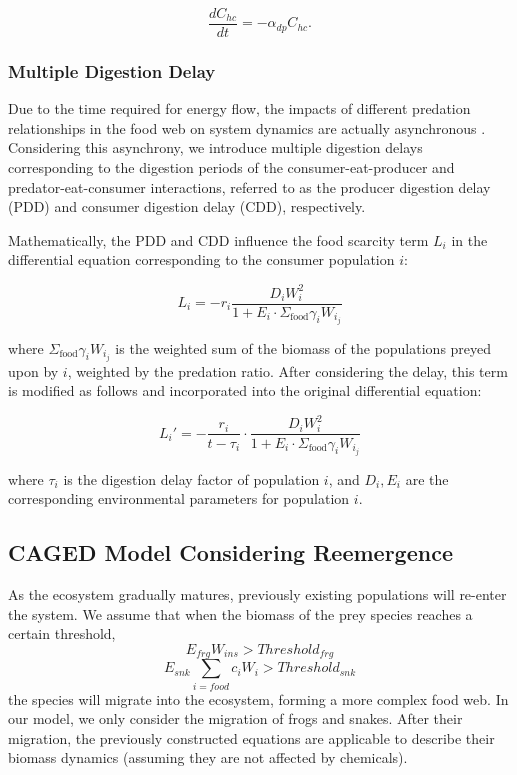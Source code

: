 \documentclass{HZNUMCM}
\begin{document}
        \begin{equation}
        \frac{dC_{hc}}{dt} = - \alpha_{dp} C_{hc}.
        \end{equation}
      
      \subsubsection{Multiple Digestion Delay}
        Due to the time required for energy flow, 
        the impacts of different predation relationships in the food web on system dynamics are actually asynchronous \cite{GUO20142850}. 
        Considering this asynchrony, 
        we introduce multiple digestion delays corresponding to the digestion periods of the consumer-eat-producer and predator-eat-consumer interactions, 
        referred to as the producer digestion delay (PDD) and consumer digestion delay (CDD), respectively.

        Mathematically, the PDD and CDD influence the food scarcity term \(L_i\) in the differential equation corresponding to the consumer population \(i\):
        
        \begin{equation}
        L_i = -r_i \frac{D_i W_i^2}{1 + E_i \cdot \Sigma_{\text{food}} \gamma_i W_{i_j}}
        \end{equation}

        where \(\Sigma_{\text{food}} \gamma_i W_{i_j}\) is the weighted sum of the biomass of the populations preyed upon by \(i\), weighted by the predation ratio. 
        After considering the delay, this term is modified as follows and incorporated into the original differential equation:
        
        \begin{equation}
        L_i' = -\frac{r_i}{t - \tau_i} \cdot \frac{D_i W_i^2}{1 + E_i \cdot \Sigma_{\text{food}} \gamma_i W_{i_j}}
        \end{equation}

        where \(\tau_i\) is the digestion delay factor of population \(i\), and \(D_i, E_i\) are the corresponding environmental parameters for population \(i\).
    \subsection{CAGED Model Considering Reemergence}
      As the ecosystem gradually matures, 
      previously existing populations will re-enter the system. 
      We assume that when the biomass of the prey species reaches a certain threshold,
      \begin{equation}
      E_{frg}W_{ins}>Threshold_{frg}
      \end{equation}
      \begin{equation}
      E_{snk}\sum_{i=food}{c_{i}W_{i}}>Threshold_{snk}
      \end{equation} 
      the species will migrate into the ecosystem, forming a more complex food web. 
      In our model, we only consider the migration of frogs and snakes. 
      After their migration, the previously constructed equations are applicable to describe their biomass dynamics 
      (assuming they are not affected by chemicals).
\end{document}
